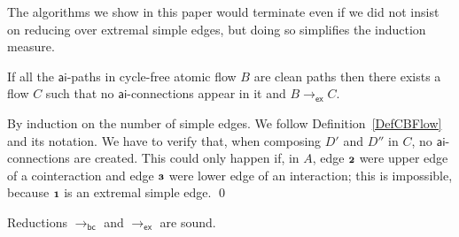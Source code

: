 \documentclass[a4paper]{LMCS}
\begin{document}
The algorithms we show in this paper would terminate even if we did not insist on reducing over extremal simple edges, but doing so simplifies the induction measure.

\begin{thm}\label{ThALSP}
If all the\/ ${\mathsf{ai}}$-paths in cycle-free atomic flow $B$ are clean paths then there exists a flow $C$ such that no\/ ${\mathsf{ai}}$-connections appear in it and $B\to_{{\mathsf{ex}}} C$.
\end{thm}

\proof
By induction on the number of simple edges. We follow Definition~\ref{DefCBFlow} and its notation. We have to verify that, when composing $D'$ and $D''$ in $C$, no ${\mathsf{ai}}$-connections are created. This could only happen if, in $A$, edge ${{\mathchoice{\scriptstyle\mathbf2}
                              {\scriptstyle\mathbf2}
                              {\scriptstyle\mathbf2}
                              {\scriptscriptstyle\mathbf2}}}$ were upper edge of a cointeraction and edge ${{\mathchoice{\scriptstyle\mathbf3}
                                {\scriptstyle\mathbf3}
                                {\scriptstyle\mathbf3}
                                {\scriptscriptstyle\mathbf3}}}$ were lower edge of an interaction; this is impossible, because ${{\mathchoice{\scriptstyle\mathbf1}
                              {\scriptstyle\mathbf1}
                              {\scriptstyle\mathbf1}
                              {\scriptscriptstyle\mathbf1}}}$ is an extremal simple edge.
\qed

\begin{thm}\label{ThLBSound}
Reductions\/ $\to_{{\mathsf{bc}}}$ and\/ $\to_{{\mathsf{ex}}}$ are sound.
\end{thm}
\end{document}
